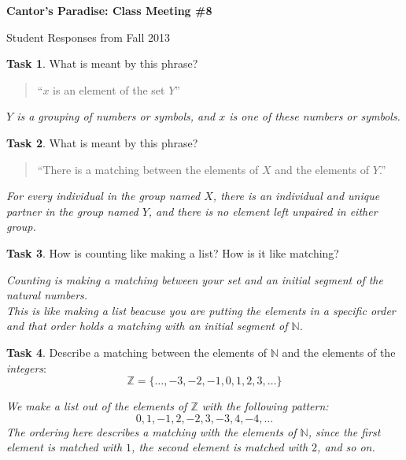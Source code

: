\documentclass[12pt]{amsart}
\theoremstyle{definition}
\newtheorem{task}{Task}
\begin{document}
\begin{center}
\textbf{\Huge
Cantor's Paradise: Class Meeting \#8
}
\end{center}
\vspace{.25in}
Student Responses from Fall 2013
\vspace{.25in}

\begin{task}
What is meant by this phrase?
\begin{quote}
``$x$ is an element of the set $Y$''
\end{quote}
\end{task}

\begin{center}
\textit{
$Y$ is a grouping of numbers or symbols, and $x$ is one of these numbers or symbols.
}
\end{center}
\vspace{.25in}

\begin{task}
What is meant by this phrase?
\begin{quote}
``There is a matching between the elements of $X$ and the elements of $Y$.''
\end{quote}
\end{task}

\begin{center}
\textit{
For every individual in the group named $X$, there is an individual and unique partner in the group named $Y$, and there is no element left unpaired in either group.
}
\end{center}
\vspace{.25in}

\begin{task}
How is counting like making a list? How is it like matching?
\end{task}

\begin{center}
\textit{
Counting is making a matching between your set and an initial segment of the natural numbers.}\\

\textit{This is like making a list beacuse you are putting the elements in a specific order and that order holds a matching with an initial segment of $\mathbb{N}$.
}
\end{center}
\vspace{.25in}

\begin{task}
Describe a matching between the elements of $\mathbb{N}$ and the elements of the \emph{integers}:
\[
\mathbb{Z} = \{ \ldots, -3, -2, -1, 0, 1, 2, 3, \ldots \}
\]
\end{task}

\begin{center}
\textit{ We make a list out of the elements of $\mathbb{Z}$ with the following pattern:
\[
0, 1, -1, 2, -2, 3, -3, 4, -4, \ldots
\]
The ordering here describes a matching with the elements of $\mathbb{N}$, since the first element is matched with $1$, the second element is matched with $2$, and so on.
}
\end{center}
\end{document}
